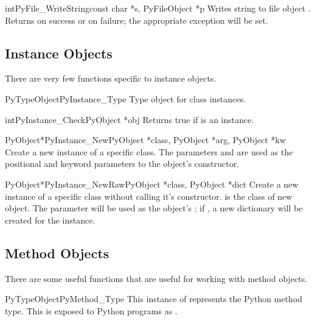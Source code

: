 \begin{cfuncdesc}{int}{PyFile_WriteString}{const char *s, PyFileObject *p}
  Writes string  to file object .  Returns  on
  success or  on failure; the appropriate exception will be
  set.
\end{cfuncdesc}


\subsection{Instance Objects \label{instanceObjects}}

There are very few functions specific to instance objects.

\begin{cvardesc}{PyTypeObject}{PyInstance_Type}
  Type object for class instances.
\end{cvardesc}

\begin{cfuncdesc}{int}{PyInstance_Check}{PyObject *obj}
  Returns true if  is an instance.
\end{cfuncdesc}

\begin{cfuncdesc}{PyObject*}{PyInstance_New}{PyObject *class,
                                             PyObject *arg,
                                             PyObject *kw}
  Create a new instance of a specific class.  The parameters 
  and  are used as the positional and keyword parameters to
  the object's constructor.
\end{cfuncdesc}

\begin{cfuncdesc}{PyObject*}{PyInstance_NewRaw}{PyObject *class,
                                                PyObject *dict}
  Create a new instance of a specific class without calling it's
  constructor.   is the class of new object.  The
   parameter will be used as the object's ;
  if \NULL, a new dictionary will be created for the instance.
\end{cfuncdesc}


\subsection{Method Objects \label{method-objects}}

There are some useful functions that are useful for working with
method objects.

\begin{cvardesc}{PyTypeObject}{PyMethod_Type}
  This instance of  represents the Python method
  type.  This is exposed to Python programs as .
\end{cvardesc}

